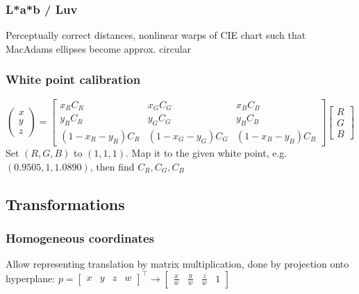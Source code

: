 \documentclass[a4paper,10pt]{article}
\begin{document}
\subsubsection{L*a*b / Luv} Perceptually correct distances, nonlinear warps of CIE chart such that MacAdams ellipses become approx. circular

\subsubsection{White point calibration}
\[
    \left(\begin{smallmatrix} x \\ y \\ z \end{smallmatrix}\right) = \left[\begin{smallmatrix} x_R C_R & x_G C_G & x_B C_B \\ y_R C_R & y_G C_G & y_B C_B \\ (1-x_R-y_R)C_R & (1-x_G-y_G)C_G & (1-x_B-y_B)C_B \end{smallmatrix}\right] \left[\begin{smallmatrix}R\\G\\B\end{smallmatrix}\right]
\] 
Set \( (R,G,B) \) to \( (1,1,1) \). Map it to the given white point, e.g. \( (0.9505, 1, 1.0890) \), then find \( C_R, C_G, C_B \)

\subsection{Transformations}
\subsubsection{Homogeneous coordinates}
Allow representing translation by matrix multiplication, done by projection onto hyperplane: \( p = \left[\begin{smallmatrix}x & y & z & w\end{smallmatrix}\right]^\top \to \left[\begin{smallmatrix}\frac{x}{w} & \frac{y}{w} & \frac{z}{w} & 1\end{smallmatrix}\right] \)
\end{document}
